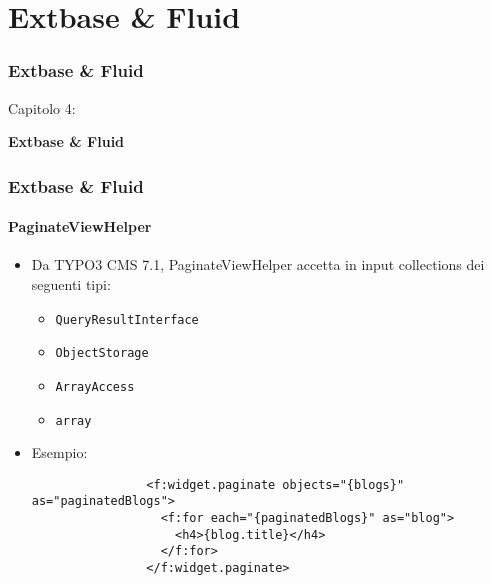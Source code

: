 %

\section{Extbase \& Fluid}
\begin{frame}[fragile]
	\frametitle{Extbase \& Fluid}

	\begin{center}\huge{Capitolo 4:}\end{center}
	\begin{center}\huge{\color{typo3darkgrey}\textbf{Extbase \& Fluid}}\end{center}

\end{frame}


\begin{frame}[fragile]
	\frametitle{Extbase \& Fluid}
	\framesubtitle{PaginateViewHelper}

	\begin{itemize}

		\item Da TYPO3 CMS 7.1, PaginateViewHelper accetta in input collections dei seguenti tipi:

			\begin{itemize}
				\item \texttt{QueryResultInterface}
				\item \texttt{ObjectStorage}
				\item \texttt{ArrayAccess}
				\item \texttt{array}
			\end{itemize}

		\item Esempio:

			\begin{lstlisting}
				<f:widget.paginate objects="{blogs}" as="paginatedBlogs">
				  <f:for each="{paginatedBlogs}" as="blog">
				    <h4>{blog.title}</h4>
				  </f:for>
				</f:widget.paginate>
			\end{lstlisting}

	\end{itemize}

\end{frame}

